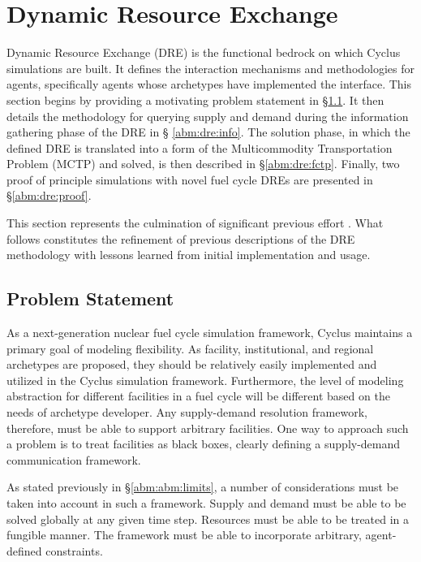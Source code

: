 \section{Dynamic Resource Exchange}\label{abm:dre}

Dynamic Resource Exchange (DRE) is the functional bedrock on which Cyclus
simulations are built. It defines the interaction mechanisms and methodologies
for agents, specifically agents whose archetypes have implemented the
 interface. This section begins by providing a motivating problem
statement in \S \ref{abm:dre:prob}. It then details the methodology for querying
supply and demand during the information gathering phase of the DRE in \S
\ref{abm:dre:info}. The solution phase, in which the defined DRE is translated
into a form of the Multicommodity Transportation Problem (MCTP) and solved, is
then described in \S \ref{abm:dre:fctp}. Finally, two proof of principle
simulations with novel fuel cycle DREs are presented in \S \ref{abm:dre:proof}.

This section represents the culmination of significant previous effort
\cite{gidden_agent-based_2013, gidden_agent-based_2014,
  gidden_agent-based_slc_2013}. What follows constitutes the refinement of
previous descriptions of the DRE methodology with lessons learned from initial
implementation and usage.

\subsection{Problem Statement}\label{abm:dre:prob}

As a next-generation nuclear fuel cycle simulation framework, Cyclus maintains a
primary goal of modeling flexibility. As facility, institutional, and regional
archetypes are proposed, they should be relatively easily implemented and
utilized in the Cyclus simulation framework. Furthermore, the level of modeling
abstraction for different facilities in a fuel cycle will be different based on
the needs of archetype developer. Any supply-demand resolution framework,
therefore, must be able to support arbitrary facilities. One way to approach
such a problem is to treat facilities as black boxes, clearly defining a
supply-demand communication framework.

As stated previously in \S \ref{abm:abm:limits}, a number of considerations must
be taken into account in such a framework. Supply and demand must be able to be
solved globally at any given time step. Resources must be able to be treated in
a fungible manner. The framework must be able to incorporate arbitrary,
agent-defined constraints.

